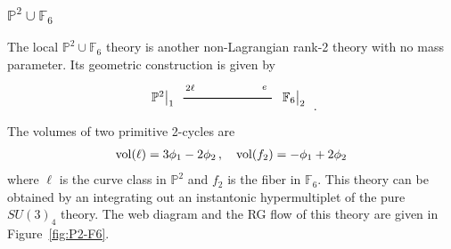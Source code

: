\subsubsection{\texorpdfstring{$ \mathbb{P}^2 \cup \mathbb{F}_6 $}{P2 U F6}}

The local $ \mathbb{P}^2 \cup \mathbb{F}_6 $ theory is another non-Lagrangian rank-2 theory with no mass parameter. Its geometric construction is given by
\begin{align}
\begin{tikzpicture}
\draw[thick](-2.5,0)--(0,0);	
\node at(-3.1,0) {$\eval{\mathbb{P}^2}_1$};
\node at(-2.3,0.3) {${}_{2\ell}$};
\node at(0.6,0) {$\eval{\mathbb{F}_{6}}_2$};
\node at(-0.2,0.3) {${}_{e}$};
\end{tikzpicture} \ .
\end{align}
The volumes of two primitive 2-cycles are
\begin{align}
\operatorname{vol}(\ell) = 3\phi_1 - 2\phi_2 \, , \quad
\operatorname{vol}(f_2) = -\phi_1 + 2\phi_2
\end{align}
where $ \ell $ is the curve class in $ \mathbb{P}^2 $ and $ f_2 $ is the fiber in $ \mathbb{F}_6 $. This theory can be obtained by an integrating out an instantonic hypermultiplet of the pure $ SU(3)_4 $ theory. The web diagram and the RG flow of this theory are given in Figure~\ref{fig:P2-F6}.
